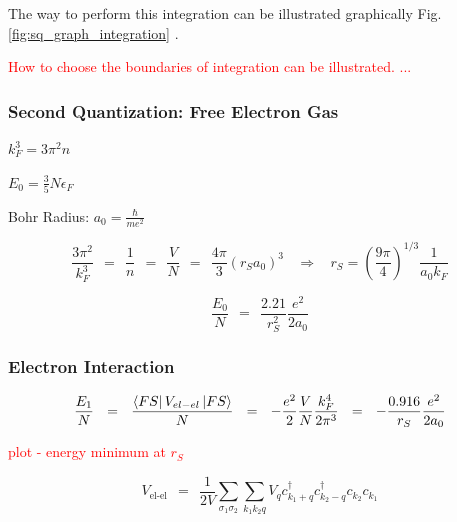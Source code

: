 \documentclass[10pt]{report}
\numberwithin{equation}{chapter}
\newcommand{\myRef}[1]{
  Fig.\ref{#1}
}
\begin{document}
The way to perform this integration can be illustrated graphically \myRef{fig:sq_graph_integration}. 

\textcolor{red}{How to choose the boundaries of integration can be illustrated. ...}









\subsubsection*{Second Quantization: Free Electron Gas} %

$ k_F^3 = 3 \pi^2 n$

$ E_0 = \frac{3}{5} N \epsilon_F$

Bohr Radius: $a_0 = \frac{\hbar}{m e^2}$

\begin{equation*}
\frac{3 \pi^2}{k_F^3} ~~ = ~~ \frac{1}{n} ~~ = ~~ \frac{V}{N} ~~ = ~~ \frac{4\pi}{3} \left(r_S a_0 \right)^3 ~~~~ \Rightarrow ~~~~ r_S = \left( \frac{9\pi}{4} \right)^{1/3} \frac{1}{a_0 k_F}
\end{equation*}

\begin{equation*}
\frac{E_0}{N} ~~ = ~~ \frac{2.21}{r_S^2} \frac{e^2}{2a_0}
\end{equation*}



\subsubsection*{Electron Interaction}

\begin{equation*}
  \frac{E_1}{N} ~~ = ~~ \frac{\bra{FS} V_{el-el} \ket{FS}}{N} ~~ = ~~ 
  - \frac{e^2}{2} \frac{V}{N} \frac{k_F^4}{2 \pi^3} ~~=~~ - \frac{0.916}{r_S} \frac{e^2}{2 a_0}
\end{equation*}


\textcolor{red}{plot - energy minimum at $r_S$}


\begin{equation}
  V_\text{el-el} ~~=~~ \frac{1}{2V} \sum_{\sigma_1 \sigma_2} \sum_{k_1 k_2 q} 
    V_q c_{k_1+q}^\dag c_{k_2-q}^\dag c_{k_2} c_{k_1}
\end{equation}


%
\end{document}
